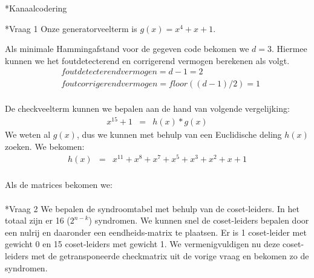 \documentclass[]{article}
\begin{document}
\begin{section}
\begin{subsection}
   	\end{subsection}

\end{section}

\begin{section}*{Kanaalcodering}
	\begin{subsection}*{Vraag 1}
		Onze generatorveelterm is $g(x) = x^4 + x + 1$.
		
        Als minimale Hammingafstand voor de gegeven code bekomen we $d=3$. 
        Hiermee kunnen we het foutdetecterend en corrigerend vermogen berekenen als volgt.
        \begin{eqnarray*}
        	& foutdetecterend vermogen = d-1 = 2 \\
        	& foutcorrigerend vermogen = floor((d-1)/2) = 1 \\
        \end{eqnarray*}        
        
        De checkveelterm kunnen we bepalen aan de hand van volgende vergelijking:
        \begin{eqnarray*}
        	x^{15} + 1 &=& h(x) * g(x)
        \end{eqnarray*}
        We weten al $g(x)$, dus we kunnen met behulp van een Euclidische deling $h(x)$ 
        zoeken. We bekomen:
        \begin{eqnarray*}
        	h(x) &=& x^{11} + x^8 + x^7 + x^5 + x^3 + x^2 + x + 1 \\
        \end{eqnarray*}
        
        Als de matrices bekomen we:
        \begin{eqnarray*}
        \end{eqnarray*}

   	\end{subsection}

    \begin{subsection}*{Vraag 2} %
    	We bepalen de syndroomtabel met behulp van de coset-leiders. In het totaal zijn er 16 ($2^{n-k}$) syndromen. We kunnen 	
    	snel de coset-leiders bepalen door een nulrij en daaronder een eendheids-matrix te plaatsen. Er is 1 coset-leider met 
    	gewicht 0 en 15 coset-leiders  met gewicht 1. We vermenigvuldigen nu deze coset-leiders met de getransponeerde checkmatrix uit de vorige vraag en bekomen zo de syndromen.\\
    

\end{subsection}
\end{section}
\end{document}
